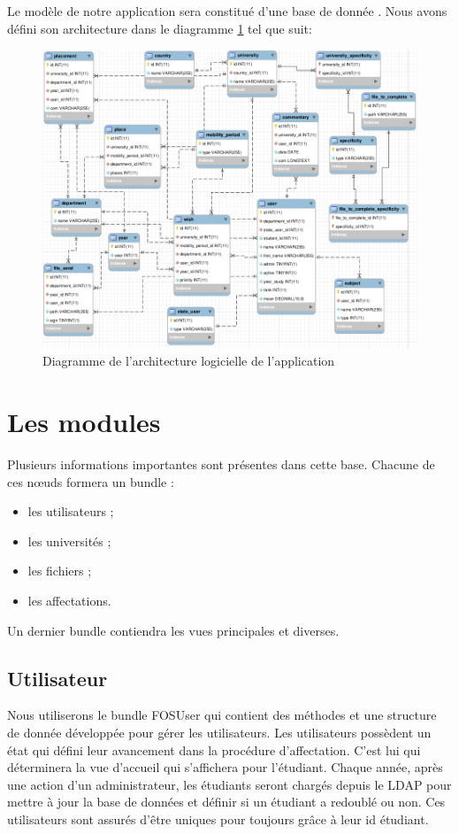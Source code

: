 Le modèle de notre application sera constitué d'une base de donnée \sql. Nous avons défini son architecture dans le diagramme \ref{fig::schema_bdd} tel que suit:

\begin{figure}[h!]
	\centering
	\includegraphics[scale=0.5]{ArchitectureLogicielle/SchemaBDD.png}
	\caption{Diagramme de l'architecture logicielle de l'application}
	\label{fig::schema_bdd}
\end{figure}


\section{Les modules}
Plusieurs informations importantes sont présentes dans cette base. Chacune de ces nœuds formera un bundle : 
\begin{itemize}
\item les utilisateurs ;
\item les universités ;
\item les fichiers ;
\item les affectations.
\end{itemize}
Un dernier bundle contiendra les vues principales et diverses.

\subsection{Utilisateur}

Nous utiliserons le bundle FOSUser qui contient des méthodes et une structure de donnée développée pour gérer les utilisateurs.
Les utilisateurs possèdent un état qui défini leur avancement dans la procédure d'affectation. C'est lui qui déterminera la vue d'accueil qui s'affichera pour l'étudiant. 
Chaque année, après une action d'un administrateur, les étudiants seront chargés depuis le LDAP pour mettre à jour la base de données et définir si un étudiant a redoublé ou non.
Ces utilisateurs sont assurés d'être uniques pour toujours grâce à leur id étudiant.


